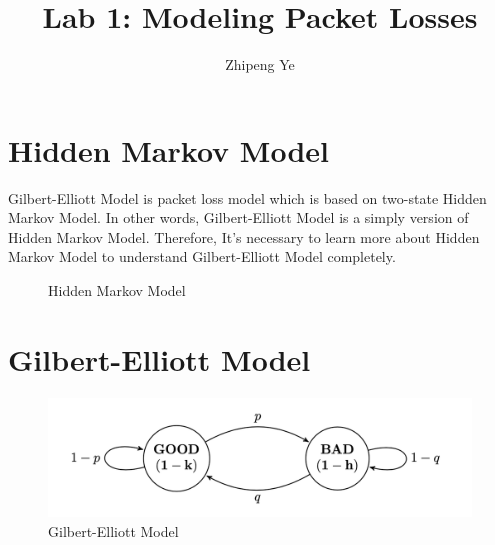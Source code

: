 \documentclass{article}
\begin{document}
\title{Lab 1: Modeling Packet Losses}
\author{Zhipeng Ye}
\maketitle
    \section{Hidden Markov Model}
    Gilbert-Elliott Model is packet loss model which is based on two-state Hidden Markov Model.
    In other words, Gilbert-Elliott Model is a simply version of Hidden Markov Model. 
    Therefore, It's necessary to learn more about Hidden Markov Model to understand Gilbert-Elliott Model completely.
    \begin{figure}[ht]
        \centering
        \caption{Hidden Markov Model}
        \label{fig:ch5:jointentropy}
    \end{figure}
       
    \section{Gilbert-Elliott Model}
    \begin{figure}[ht]
        \centering
        \includegraphics[scale=0.5]{figure1.png}
        \caption{Gilbert-Elliott Model}
        \label{fig:label}
    \end{figure}
\end{document}
